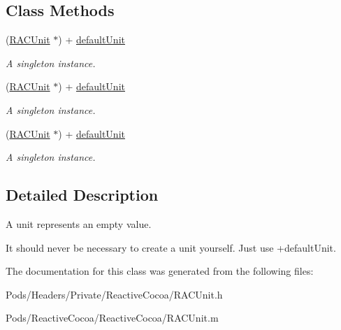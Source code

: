 \subsection*{Class Methods}
\begin{DoxyCompactItemize}
\item 
\mbox{\label{interface_r_a_c_unit_a69ef370b51c8d2af28761fcf5109a74a}} 
(\mbox{\hyperlink{interface_r_a_c_unit}{R\+A\+C\+Unit}} $\ast$) + \mbox{\hyperlink{interface_r_a_c_unit_a69ef370b51c8d2af28761fcf5109a74a}{default\+Unit}}
\begin{DoxyCompactList}\small\item\em A singleton instance. \end{DoxyCompactList}\item 
\mbox{\label{interface_r_a_c_unit_a69ef370b51c8d2af28761fcf5109a74a}} 
(\mbox{\hyperlink{interface_r_a_c_unit}{R\+A\+C\+Unit}} $\ast$) + \mbox{\hyperlink{interface_r_a_c_unit_a69ef370b51c8d2af28761fcf5109a74a}{default\+Unit}}
\begin{DoxyCompactList}\small\item\em A singleton instance. \end{DoxyCompactList}\item 
\mbox{\label{interface_r_a_c_unit_a69ef370b51c8d2af28761fcf5109a74a}} 
(\mbox{\hyperlink{interface_r_a_c_unit}{R\+A\+C\+Unit}} $\ast$) + \mbox{\hyperlink{interface_r_a_c_unit_a69ef370b51c8d2af28761fcf5109a74a}{default\+Unit}}
\begin{DoxyCompactList}\small\item\em A singleton instance. \end{DoxyCompactList}\end{DoxyCompactItemize}


\subsection{Detailed Description}
A unit represents an empty value.

It should never be necessary to create a unit yourself. Just use +default\+Unit. 

The documentation for this class was generated from the following files\+:\begin{DoxyCompactItemize}
\item 
Pods/\+Headers/\+Private/\+Reactive\+Cocoa/R\+A\+C\+Unit.\+h\item 
Pods/\+Reactive\+Cocoa/\+Reactive\+Cocoa/R\+A\+C\+Unit.\+m\end{DoxyCompactItemize}

